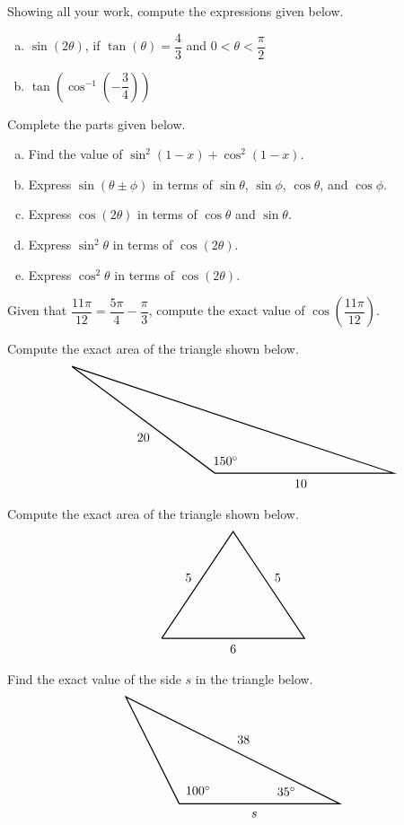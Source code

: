 \documentclass[12pt,letterpaper]{exam}
\begin{document}
\begin{questions}
\newpage
\question[10] Showing all your work, compute the expressions given below.
	\begin{enumerate}[(a)]
	\item $\sin(2\theta)$, if $\tan(\theta)= \dfrac{4}{3}$ and $0 < \theta < \dfrac{\pi}{2}$
	\item $\tan \!\left( \cos^{-1} \left( -\dfrac{3}{4} \right) \right)$
	\end{enumerate}



\newpage
\question[10] Complete the parts given below.
	\begin{enumerate}[(a)]
	\item Find the value of $\sin^2(1 - x) + \cos^2(1 - x)$.
	\item Express $\sin(\theta \pm \phi)$ in terms of $\sin \theta$, $\sin \phi$, $\cos \theta$, and $\cos \phi$. 
	\item Express $\cos(2\theta)$ in terms of $\cos \theta$ and $\sin \theta$. 
	\item Express $\sin^2 \theta$ in terms of $\cos(2\theta)$.
	\item Express $\cos^2 \theta$ in terms of $\cos(2\theta)$. 
	\end{enumerate}



\newpage
\question[10] Given that $\dfrac{11\pi}{12}= \dfrac{5\pi}{4} - \dfrac{\pi}{3}$, compute the exact value of $\cos \left( \dfrac{11\pi}{12} \right)$. 



\newpage
\question[10] Compute the exact area of the triangle shown below. 
	\[
	\begin{tikzpicture}
	\draw[line width=0.03cm] (-4,3) -- (0,0) -- (5,0) -- (-4,3);
	\node at (0.3,0.35) {$150^\circ$};
	\node at (2.4,-0.3) {$10$};
	\node at (-2,1) {$20$};
	\end{tikzpicture}
	\]



\newpage
\question[10] Compute the exact area of the triangle shown below.
	\[
	\begin{tikzpicture}
	\draw[line width=0.03cm] (-2,0) -- (0,3) -- (2,0) -- (-2,0);
	\node at (-1.25,1.7) {$5$};
	\node at (1.25,1.7) {$5$};
	\node at (0,-0.3) {$6$};
	\end{tikzpicture}
	\]



\newpage
\question[10] Find the exact value of the side $s$ in the triangle below. 
	\[
	\begin{tikzpicture}[scale=1.5]
	\draw[line width=0.03cm] (-1,0) -- (-2,2) -- (2,0) -- (-1,0);
	\node at (-0.65,0.25) {$100^\circ$};
	\node at (1.0,0.23) {$35^\circ$};
	\node at (0.2,1.2) {$38$};
	\node at (0.4,-0.2) {$s$};
	\end{tikzpicture}
	\]




\end{questions}
\end{document}
